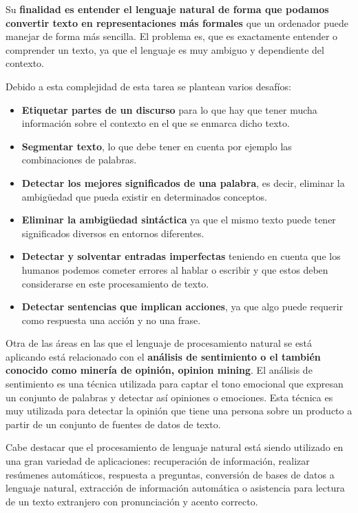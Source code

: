 \documentclass[12pt, twoside, openright]{report} %
\begin{document}
Su \textbf{finalidad es entender el lenguaje natural de forma que podamos convertir texto en representaciones más formales} que un ordenador puede manejar de forma más sencilla. El problema es, que es exactamente entender o comprender un texto, ya que el lenguaje es muy ambiguo y dependiente del contexto.

Debido a esta complejidad de esta tarea se plantean varios desafíos:
\begin{itemize}
	\item \textbf{Etiquetar partes de un discurso} para lo que hay que tener mucha información sobre el contexto en el que se enmarca dicho texto.
	\item \textbf{Segmentar texto}, lo que debe tener en cuenta por ejemplo las combinaciones de palabras.
	\item \textbf{Detectar los mejores significados de una palabra}, es decir, eliminar la ambigüedad que pueda existir en determinados conceptos.
	\item \textbf{Eliminar la ambigüedad sintáctica} ya que el mismo texto puede tener significados diversos en entornos diferentes.
	\item \textbf{Detectar y solventar entradas imperfectas} teniendo en cuenta que los humanos podemos cometer errores al hablar o escribir y que estos deben considerarse en este procesamiento de texto.
	\item \textbf{Detectar sentencias que implican acciones}, ya que algo puede requerir como respuesta una acción y no una frase.
\end{itemize}

Otra de las áreas en las que el lenguaje de procesamiento natural se está aplicando está relacionado con el \textbf{análisis de sentimiento o el también conocido como minería de opinión, opinion mining}. El análisis de sentimiento es una técnica utilizada para captar el tono emocional que expresan un conjunto de palabras y detectar así opiniones o emociones. Esta técnica es muy utilizada para detectar la opinión que tiene una persona sobre un producto a partir de un conjunto de fuentes de datos de texto.

Cabe destacar que el procesamiento de lenguaje natural está siendo utilizado en una gran variedad de aplicaciones: recuperación de información, realizar resúmenes automáticos, respuesta a preguntas, conversión de bases de datos a lenguaje natural, extracción de información automática o asistencia para lectura de un texto extranjero con pronunciación y acento correcto.
\end{document}
